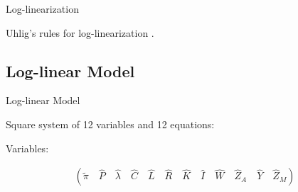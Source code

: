 \documentclass[
presentation.tex
]{subfiles}
\begin{document}

\begin{frame}{Log-linearization}
	
	Uhlig's rules for log-linearization \cite{uhlig_toolkit_1999}.
	
\end{frame}


\subsection{Log-linear Model}

\begin{frame}[allowframebreaks]{Log-linear Model}

	Square system of 12 variables and 12 equations:
	
	Variables:
	
	\begin{align}
		\left( \tilde{\pi} \quad \hat{P} \quad \hat{\lambda} \quad \hat{C} \quad \hat{L} \quad \hat{R} \quad \hat{K} \quad \hat{I} \quad \hat{W} \quad \hat{Z}_A \quad \hat{Y} \quad \hat{Z}_M \right)
	\end{align}
	
\end{frame}

\end{document}
